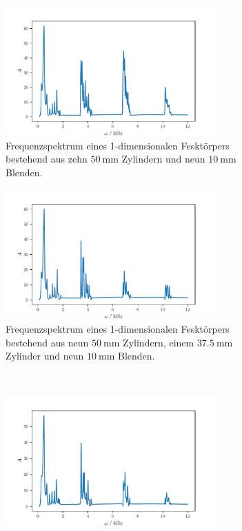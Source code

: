 \begin{figure}
    \begin{subfigure}{0.48\textwidth}%
        \centering%
        \includegraphics[height=5cm]{build/10c9b10.pdf}%
        \caption{Frequenzspektrum eines 1-dimensionalen Fesktörpers bestehend aus zehn $\qty{50}{\milli\meter}$ Zylindern und neun $\qty{10}{\milli\meter}$ Blenden.}%
        \label{fig:10c9b}%
    \end{subfigure}%
    \hfill%
    \begin{subfigure}{0.48\textwidth}%
        \centering%
        \includegraphics[height=5cm]{build/10c9b375.pdf}
        \caption{Frequenzspektrum eines 1-dimensionalen Fesktörpers bestehend aus neun $\qty{50}{\milli\meter}$ Zylindern, einem 
        $\qty{37.5}{\milli\meter}$ Zylinder und neun $\qty{10}{\milli\meter}$ Blenden.}%
        \label{fig:10c9b375}
    \end{subfigure} \\
    \begin{subfigure}{0.48\textwidth}%
        \centering%
        \includegraphics[height=5cm]{build/10c9b625.pdf}%

\end{subfigure}
\end{figure}
